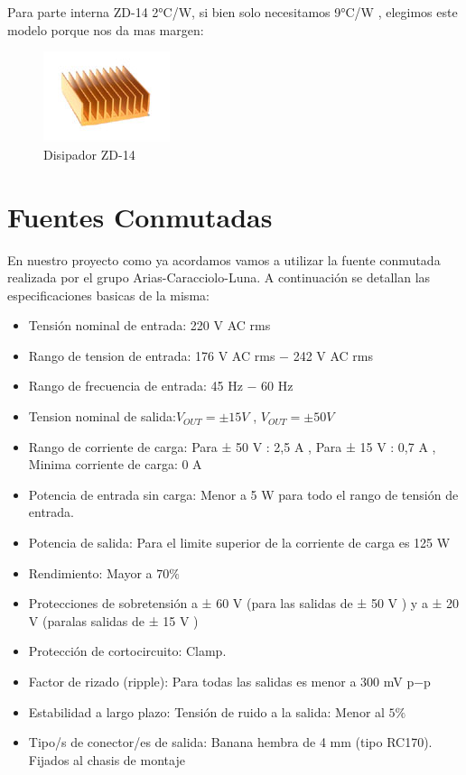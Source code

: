 \documentclass[a4paper,12pt,twoside]{article}
\begin{document}
Para parte interna ZD-14 2°C/W, si bien solo necesitamos 9°C/W , elegimos este modelo porque nos da mas margen:

\begin{figure}[H]
    \centering
    \includegraphics[height=0.4\textwidth]{img/zd14.jpg}
    \caption{Disipador ZD-14}
    \label{fig:diszd14}
\end{figure}

\section{Fuentes Conmutadas}
\label{sec:fuente}

En nuestro proyecto como ya acordamos vamos a utilizar la fuente conmutada realizada por el grupo Arias-Caracciolo-Luna.
A continuación se detallan las especificaciones basicas de la misma:

\begin{itemize}
\item{Tensión nominal de entrada: 220 V AC rms}
\item{Rango de tension de entrada: 176 V AC rms − 242 V AC rms}
\item{Rango de frecuencia de entrada: 45 Hz − 60 Hz}
\item{Tension nominal de salida:$ V_{OUT} = ± 15 V$ , $V_{OUT} = ± 50 V$}
\item{Rango de corriente de carga: Para ± 50 V : 2,5 A , Para ± 15 V : 0,7 A , Minima corriente de carga: 0 A}
\item{Potencia de entrada sin carga: Menor a 5 W para todo el rango de tensión de entrada.}
\item{Potencia de salida: Para el limite superior de la corriente de carga es 125 W}
\item{Rendimiento: Mayor a $70\%$}
\item{Protecciones de sobretensión a ± 60 V (para las salidas de ± 50 V ) y a ± 20 V (paralas salidas de ± 15 V )}
\item{Protección de cortocircuito: Clamp.}
\item{Factor de rizado (ripple): Para todas las salidas es menor a 300 mV p−p}
\item{Estabilidad a largo plazo: Tensión de ruido a la salida: Menor al $5\%$}
\item{Tipo/s de conector/es de salida: Banana hembra de 4 mm  (tipo RC170). Fijados al chasis de montaje}
\end{itemize}
\end{document}
